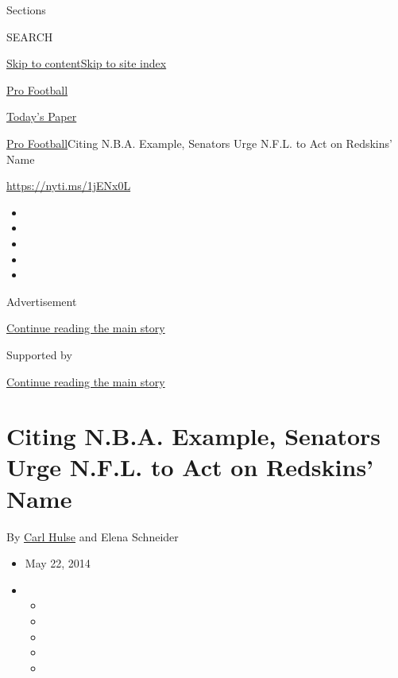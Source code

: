 Sections

SEARCH

\protect\hyperlink{site-content}{Skip to
content}\protect\hyperlink{site-index}{Skip to site index}

\href{https://www.nytimes3xbfgragh.onion/section/sports/football}{Pro
Football}

\href{https://myaccount.nytimes3xbfgragh.onion/auth/login?response_type=cookie\&client_id=vi}{}

\href{https://www.nytimes3xbfgragh.onion/section/todayspaper}{Today's
Paper}

\href{/section/sports/football}{Pro Football}\textbar{}Citing N.B.A.
Example, Senators Urge N.F.L. to Act on Redskins' Name

\url{https://nyti.ms/1jENx0L}

\begin{itemize}
\item
\item
\item
\item
\item
\end{itemize}

Advertisement

\protect\hyperlink{after-top}{Continue reading the main story}

Supported by

\protect\hyperlink{after-sponsor}{Continue reading the main story}

\hypertarget{citing-nba-example-senators-urge-nfl-to-act-on-redskins-name}{%
\section{Citing N.B.A. Example, Senators Urge N.F.L. to Act on Redskins'
Name}\label{citing-nba-example-senators-urge-nfl-to-act-on-redskins-name}}

By \href{http://www.nytimes3xbfgragh.onion/by/carl-hulse}{Carl Hulse}
and Elena Schneider

\begin{itemize}
\item
  May 22, 2014
\item
  \begin{itemize}
  \item
  \item
  \item
  \item
  \item
  \end{itemize}
\end{itemize}

